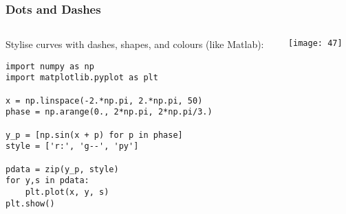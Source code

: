 \begin{frame}[fragile]\frametitle{Dots and Dashes}

\begin{columns}
    \begin{column}[T]{0.6\linewidth}
    Stylise curves with dashes, shapes, and colours (like Matlab):
    \begin{lstlisting}
import numpy as np
import matplotlib.pyplot as plt

x = np.linspace(-2.*np.pi, 2.*np.pi, 50)
phase = np.arange(0., 2*np.pi, 2*np.pi/3.)

y_p = [np.sin(x + p) for p in phase]
style = ['r:', 'g--', 'py']

pdata = zip(y_p, style)
for y,s in pdata:
    plt.plot(x, y, s)
plt.show()
    \end{lstlisting}

    \end{column}
    \begin{column}[T]{0.4\linewidth}

\begin{center}
\texttt{[image: 47]}
\end{center}

    \end{column}
  \end{columns}
  
  


\end{frame}

